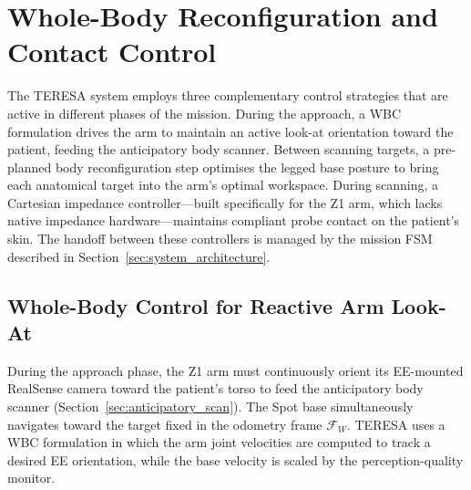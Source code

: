 \section{Whole-Body Reconfiguration and Contact Control}
\label{sec:method}

The \ac{TERESA} system employs three complementary control strategies that
are active in different phases of the mission. During the approach, a
\ac{WBC} formulation drives the arm to maintain an active look-at
orientation toward the patient, feeding the anticipatory body scanner.
Between scanning targets, a pre-planned body reconfiguration step optimises
the legged base posture to bring each anatomical target into the arm's
optimal workspace. During scanning, a Cartesian impedance controller---built
specifically for the Z1 arm, which lacks native impedance hardware---maintains
compliant probe contact on the patient's skin. The handoff between these
controllers is managed by the mission \ac{FSM} described in
Section~\ref{sec:system_architecture}.

\subsection{Whole-Body Control for Reactive Arm Look-At}

During the approach phase, the Z1 arm must continuously orient its
\ac{EE}-mounted RealSense camera toward the patient's torso to feed the
anticipatory body scanner (Section~\ref{sec:anticipatory_scan}). The Spot
base simultaneously navigates toward the target fixed in the odometry frame
$\mathcal{F}_W$. \ac{TERESA} uses a \ac{WBC} formulation in which the arm
joint velocities are computed to track a desired \ac{EE} orientation, while
the base velocity is scaled by the perception-quality monitor.

